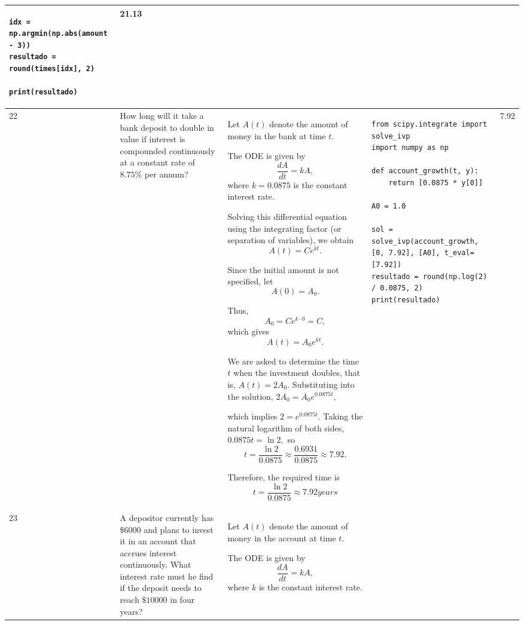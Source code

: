 \documentclass[a4paper,12pt]{article}
\begin{document}
\begin{longtable}{|p{0.3cm}|p{}|p{10cm}|p{}|p{1.5cm}|}
\begin{verbatim}
idx = np.argmin(np.abs(amount - 3))
resultado = round(times[idx], 2)

print(resultado)\end{verbatim}& 21.13   \\ \hline    
22            & How long will it take a bank deposit to double in value if interest is compounded continuously at a constant rate of \(8.75\%\) per annum?


              & Let \(A(t)\) denote the amount of money in the bank at time \(t\).

The ODE is given by
\[
\frac{dA}{dt}=kA,
\]
where \(k=0.0875\) is the constant interest rate.

Solving this differential equation using the integrating factor (or separation of variables), we obtain
\[
A(t)=Ce^{kt}.
\]

Since the initial amount is not specified, let
\[
A(0)=A_0.
\]

Thus,
\[
A_0=Ce^{k\cdot0}=C,
\]
which gives
\[
A(t)=A_0e^{kt}.
\]

We are asked to determine the time \(t\) when the investment doubles, that is, $A(t)=2A_0.$
Substituting into the solution, $ 2A_0=A_0e^{0.0875t},$

which implies  $2=e^{0.0875t}.$
Taking the natural logarithm of both sides, $0.0875t=\ln 2,$ so
\[
t=\frac{\ln 2}{0.0875}\approx\frac{0.6931}{0.0875}\approx7.92.
\]

Therefore, the required time is
\[
t=\frac{\ln 2}{0.0875}\approx7.92  years
\]   &\begin{verbatim}
from scipy.integrate import solve_ivp
import numpy as np

def account_growth(t, y):
    return [0.0875 * y[0]]

A0 = 1.0

sol = solve_ivp(account_growth, [0, 7.92], [A0], t_eval=[7.92])
resultado = round(np.log(2) / 0.0875, 2)
print(resultado)\end{verbatim}& 7.92   \\ \hline   

23            & A depositor currently has \(\$6000\) and plans to invest it in an account that accrues interest continuously. What interest rate must he find if the deposit needs to reach \(\$10000\) in four years?


              & Let \(A(t)\) denote the amount of money in the account at time \(t\).

The ODE is given by
\[
\frac{dA}{dt}=kA,
\]
where \(k\) is the constant interest rate.


\end{longtable}
\end{document}
